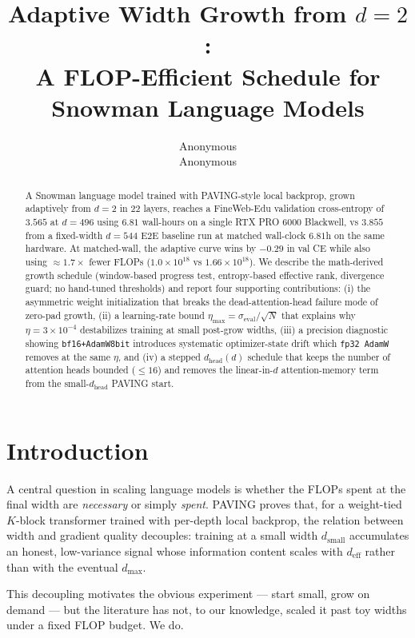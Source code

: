 \documentclass{article}
\title{Adaptive Width Growth from $d=2$:\\
A FLOP-Efficient Schedule for Snowman Language Models}
\author{\name{} Anonymous \\ \addr{} Anonymous}
\newcommand{\deff}{d_{\mathrm{eff}}}
\begin{document}
\maketitle

\begin{abstract}
A Snowman language model trained with PAVING-style local backprop, grown
adaptively from $d=2$ in 22 layers, reaches a FineWeb-Edu validation
cross-entropy of $3.565$ at $d{=}496$ using $6.81$ wall-hours on a
single RTX PRO 6000 Blackwell, vs $3.855$ from a fixed-width $d{=}544$
E2E baseline run at matched wall-clock $6.81$h on the same hardware.
At matched-wall, the adaptive curve wins by $-0.29$ in val CE while
also using $\approx 1.7\times$ fewer FLOPs
($1.0{\times}10^{18}$ vs $1.66{\times}10^{18}$).  We describe the math-derived growth schedule
(window-based progress test, entropy-based effective rank, divergence
guard; no hand-tuned thresholds) and report four supporting
contributions: (i) the asymmetric weight initialization that breaks
the dead-attention-head failure mode of zero-pad growth, (ii) a
learning-rate bound $\eta_{\max} = \sigma_{\text{eval}}/\sqrt{N}$ that
explains why $\eta = 3{\times}10^{-4}$ destabilizes training at small
post-grow widths, (iii) a precision diagnostic showing
\texttt{bf16+AdamW8bit} introduces systematic optimizer-state drift
which \texttt{fp32 AdamW} removes at the same $\eta$, and (iv) a
stepped $d_{\text{head}}(d)$ schedule that keeps the number of
attention heads bounded ($\le 16$) and removes the linear-in-$d$
attention-memory term from the small-$d_{\text{head}}$ PAVING start.
\end{abstract}

\section{Introduction}

A central question in scaling language models is whether the FLOPs spent at
the final width are \emph{necessary} or simply \emph{spent}.  PAVING
\citep{paving} proves that, for a weight-tied $K$-block transformer trained
with per-depth local backprop, the relation between width and gradient
quality decouples: training at a small width $d_{\text{small}}$ accumulates
an honest, low-variance signal whose information content scales with
$\deff$ rather than with the eventual $d_{\max}$.

This decoupling motivates the obvious experiment --- start small, grow on
demand --- but the literature has not, to our knowledge, scaled it past toy
widths under a fixed FLOP budget.  We do.
\end{document}
